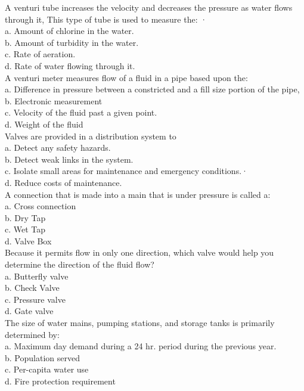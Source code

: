 A venturi tube increases the velocity and decreases the pressure as water flows through it, This type of tube is used to measure the: ·\\
a. Amount of chlorine in the water.\\
b. Amount of turbidity in the water.\\
c. Rate of aeration.\\
d. Rate of water flowing through it.\\

A venturi meter measures flow of a fluid in a pipe based upon the:\\
a. Difference in pressure between a constricted and a fill size portion of the pipe,\\
b. Electronic measurement\\
c. Velocity of the fluid past a given point.\\
d. Weight of the fluid\\

Valves are provided in a distribution system to\\
a. Detect any safety hazards.\\
b. Detect weak links in the system.\\
c. Isolate small areas for maintenance and emergency conditions.·\\
d. Reduce costs of maintenance.\\

A connection that is made into a main that is under pressure is called a:\\
a. Cross connection\\
b. Dry Tap\\
c. Wet Tap\\
d. Valve Box\\

 Because it permits flow in only one direction, which valve would help you determine the direction of the fluid flow?\\
a. Butterfly valve\\
b. Check Valve\\
c. Pressure valve\\
d. Gate valve\\

The size of water mains, pumping stations, and storage tanks is primarily
determined by:\\
a. Maximum day demand during a 24 hr. period during the previous year.\\
b. Population served\\
c. Per-capita water use\\
d. Fire protection requirement\\

